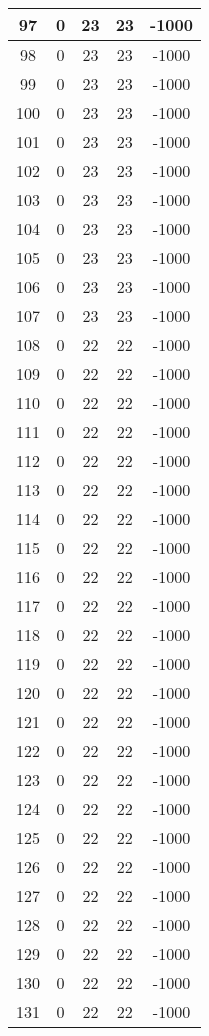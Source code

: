 \documentclass[letterpaper, 12pt]{article}
\begin{document}
\begin{longtable}{|c|c|c|c|c|}
\hline
97 & 0 & 23 & 23 & -1000 \\
\hline
98 & 0 & 23 & 23 & -1000 \\
\hline
99 & 0 & 23 & 23 & -1000 \\
\hline
100 & 0 & 23 & 23 & -1000 \\
\hline
101 & 0 & 23 & 23 & -1000 \\
\hline
102 & 0 & 23 & 23 & -1000 \\
\hline
103 & 0 & 23 & 23 & -1000 \\
\hline
104 & 0 & 23 & 23 & -1000 \\
\hline
105 & 0 & 23 & 23 & -1000 \\
\hline
106 & 0 & 23 & 23 & -1000 \\
\hline
107 & 0 & 23 & 23 & -1000 \\
\hline
108 & 0 & 22 & 22 & -1000 \\
\hline
109 & 0 & 22 & 22 & -1000 \\
\hline
110 & 0 & 22 & 22 & -1000 \\
\hline
111 & 0 & 22 & 22 & -1000 \\
\hline
112 & 0 & 22 & 22 & -1000 \\
\hline
113 & 0 & 22 & 22 & -1000 \\
\hline
114 & 0 & 22 & 22 & -1000 \\
\hline
115 & 0 & 22 & 22 & -1000 \\
\hline
116 & 0 & 22 & 22 & -1000 \\
\hline
117 & 0 & 22 & 22 & -1000 \\
\hline
118 & 0 & 22 & 22 & -1000 \\
\hline
119 & 0 & 22 & 22 & -1000 \\
\hline
120 & 0 & 22 & 22 & -1000 \\
\hline
121 & 0 & 22 & 22 & -1000 \\
\hline
122 & 0 & 22 & 22 & -1000 \\
\hline
123 & 0 & 22 & 22 & -1000 \\
\hline
124 & 0 & 22 & 22 & -1000 \\
\hline
125 & 0 & 22 & 22 & -1000 \\
\hline
126 & 0 & 22 & 22 & -1000 \\
\hline
127 & 0 & 22 & 22 & -1000 \\
\hline
128 & 0 & 22 & 22 & -1000 \\
\hline
129 & 0 & 22 & 22 & -1000 \\
\hline
130 & 0 & 22 & 22 & -1000 \\
\hline
131 & 0 & 22 & 22 & -1000 \\

\end{longtable}
\end{document}
